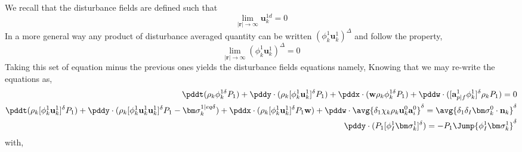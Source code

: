 We recall that the disturbance fields are defined such that 
\begin{equation*}
    \lim_{|\textbf{r}|\to \infty}
    \textbf{u}_k^{1d}
    = 0 
\end{equation*}
In a more general way any product of disturbance averaged quantity can be written $(\phi_k^1 \textbf{u}_k^1)^\Delta$ and follow the property, 
\begin{equation*}
    \lim_{|\textbf{r}|\to \infty}
    (\phi_k^1 \textbf{u}_k^1)^\Delta
    = 0 
\end{equation*}
Taking this set of equation minus the previous ones yields the disturbance fields equations namely, 
Knowing that we may re-write the equations as, 
\begin{align*}
    \pddt (\rho_k \phi_k^{1\delta} P_1 )
    +  \pddy \cdot (\rho_k [\phi_k^1 \textbf{u}_k^1]^\delta P_1 )
    +  \pddx \cdot (\textbf{w} \rho_k \phi_k^{1\delta} P_1)
    +  \pddw \cdot ([\textbf{a}_{p|f}^1 \phi_k^1 ]^\delta \rho_k P_1)
    = 0 \\
    \pddt  (\rho_k[ \phi_k^1 \textbf{u}_k^1 ]^\delta P_1 ) 
    +  \pddy\cdot (\rho_k[ \phi_k^1 \textbf{u}_k^1 \textbf{u}_k^1]^\delta P_1 
    -  \bm\sigma_k^{1|eq\delta} )
    +  \pddx\cdot (\rho_k[ \phi_k^1 \textbf{u}_k^1 ]^\delta P_1 \textbf{w})
    +  \pddw\cdot \avg{\delta_1\chi_k \rho_k  \textbf{u}_k^0 \textbf{a}_i^0}^\delta
    = \avg{\delta_1\delta_I \bm\sigma_k^0 \cdot \textbf{n}_k}^\delta\\
    \pddy \cdot (P_1[ \phi_I^1 \bm\sigma_k^1 ]^\delta)= -  P_1 \Jump{\phi_I^1 \bm\sigma_k^1}^\delta
\end{align*}
with, 
